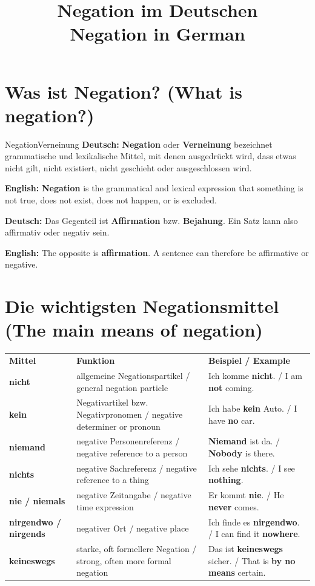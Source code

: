 \documentclass[a4paper,11pt]{article}
\title{Negation im Deutschen\\{\large\textnormal{Negation in German}}}
\date{}
\newcommand{\GermanText}[1]{\textbf{Deutsch: }#1\par}
\newcommand{\EnglishText}[1]{{\small\color{SoftGray}\textbf{English: }#1\par}}
\begin{document}
\maketitle
\tableofcontents
\newpage

\section{Was ist Negation? \textnormal{(What is negation?)}}
\begin{grammarentry}{Negation}{Verneinung}
\GermanText{\textbf{Negation} oder \textbf{Verneinung} bezeichnet grammatische und lexikalische Mittel, mit denen ausgedrückt wird, dass etwas nicht gilt, nicht existiert, nicht geschieht oder ausgeschlossen wird.}
\EnglishText{\textbf{Negation} is the grammatical and lexical expression that something is not true, does not exist, does not happen, or is excluded.}
\GermanText{Das Gegenteil ist \textbf{Affirmation} bzw. \textbf{Bejahung}. Ein Satz kann also affirmativ oder negativ sein.}
\EnglishText{The opposite is \textbf{affirmation}. A sentence can therefore be affirmative or negative.}
\end{grammarentry}

\section{Die wichtigsten Negationsmittel \textnormal{(The main means of negation)}}
\begin{longtable}{>{\bfseries}p{2.7cm}|p{4.2cm}|p{6.1cm}}
\rowcolor{HeaderBlueDark}
\color{white}\textbf{Mittel} & \color{white}\textbf{Funktion} & \color{white}\textbf{Beispiel / Example}\\
nicht & allgemeine Negationspartikel / general negation particle & Ich komme \textbf{nicht}. / I am \textbf{not} coming.\\
kein & Negativartikel bzw. Negativpronomen / negative determiner or pronoun & Ich habe \textbf{kein} Auto. / I have \textbf{no} car.\\
niemand & negative Personenreferenz / negative reference to a person & \textbf{Niemand} ist da. / \textbf{Nobody} is there.\\
nichts & negative Sachreferenz / negative reference to a thing & Ich sehe \textbf{nichts}. / I see \textbf{nothing}.\\
nie / niemals & negative Zeitangabe / negative time expression & Er kommt \textbf{nie}. / He \textbf{never} comes.\\
nirgendwo / nirgends & negativer Ort / negative place & Ich finde es \textbf{nirgendwo}. / I can find it \textbf{nowhere}.\\
keineswegs & starke, oft formellere Negation / strong, often more formal negation & Das ist \textbf{keineswegs} sicher. / That is \textbf{by no means} certain.\\
\end{longtable}
\end{document}
